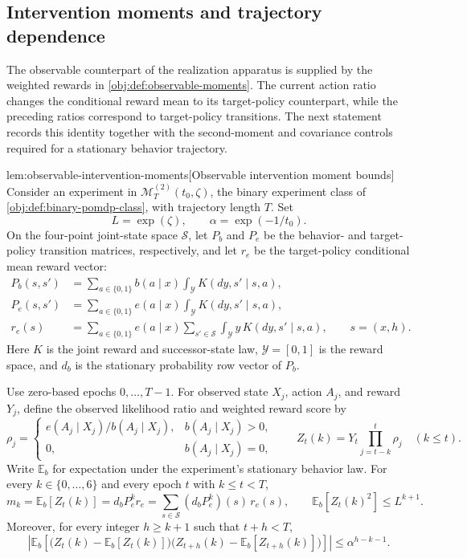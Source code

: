 \subsection{Intervention moments and trajectory dependence}

The observable counterpart of the realization apparatus is supplied by the weighted rewards in \cref{obj:def:observable-moments}. The current action ratio changes the conditional reward mean to its target-policy counterpart, while the preceding ratios correspond to target-policy transitions. The next statement records this identity together with the second-moment and covariance controls required for a stationary behavior trajectory.

\begin{lemmav}{lem:observable-intervention-moments}[Observable intervention moment bounds]
Consider an experiment in \(\mathcal M_T^{(2)}(t_0,\zeta)\), the binary experiment class of \cref{obj:def:binary-pomdp-class}, with trajectory length \(T\). Set
\[
L=\exp(\zeta),\qquad \alpha=\exp(-1/t_0).
\]
On the four-point joint-state space \(\mathcal S\), let \(P_b\) and \(P_e\) be the behavior- and target-policy transition matrices, respectively, and let \(r_e\) be the target-policy conditional mean reward vector:
\[
\begin{aligned}
P_b(s,s')&=\sum_{a\in\{0,1\}}b(a\mid x)
                  \int_{\mathcal Y}K(dy,s'\mid s,a),\\
P_e(s,s')&=\sum_{a\in\{0,1\}}e(a\mid x)
                  \int_{\mathcal Y}K(dy,s'\mid s,a),\\
r_e(s)&=\sum_{a\in\{0,1\}}e(a\mid x)
                  \sum_{s'\in\mathcal S}\int_{\mathcal Y}y\,K(dy,s'\mid s,a),
\qquad s=(x,h).
\end{aligned}
\]
Here \(K\) is the joint reward and successor-state law, \(\mathcal Y=[0,1]\) is the reward space, and \(d_b\) is the stationary probability row vector of \(P_b\).

Use zero-based epochs \(0,\ldots,T-1\). For observed state \(X_j\), action \(A_j\), and reward \(Y_j\), define the observed likelihood ratio and weighted reward score by
\[
\rho_j=
\begin{cases}
e(A_j\mid X_j)/b(A_j\mid X_j),& b(A_j\mid X_j)>0,\\
0,& b(A_j\mid X_j)=0,
\end{cases}
\qquad
Z_t(k)=Y_t\prod_{j=t-k}^{t}\rho_j
\quad (k\le t).
\]
Write \(\mathbb E_b\) for expectation under the experiment's stationary behavior law. For every \(k\in\{0,\ldots,6\}\) and every epoch \(t\) with \(k\le t<T\),
\[
m_k=\mathbb E_b[Z_t(k)]
    =d_bP_e^kr_e
    =\sum_{s\in\mathcal S}(d_bP_e^k)(s)\,r_e(s),
\qquad
\mathbb E_b[Z_t(k)^2]\le L^{k+1}.
\]
Moreover, for every integer \(h\ge k+1\) such that \(t+h<T\),
\[
\left|
\mathbb E_b\!\left[
\bigl(Z_t(k)-\mathbb E_b[Z_t(k)]\bigr)
\bigl(Z_{t+h}(k)-\mathbb E_b[Z_{t+h}(k)]\bigr)
\right]
\right|
\le \alpha^{h-k-1}.
\]
\end{lemmav}

